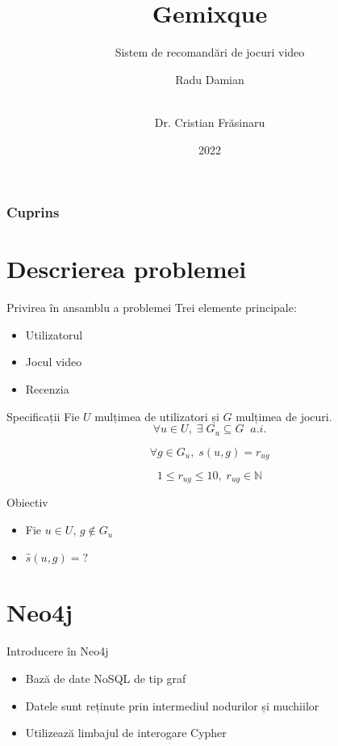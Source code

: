 \documentclass{beamer}
\title[Gemixque - sistem de recomandări de jocuri video]{Gemixque}
\subtitle{Sistem de recomandări de jocuri video}
\author[Radu Damian]{Radu Damian \and \\[9mm] Dr. Cristian Frăsinaru}
\institute{Facultatea de Informatică}
\date{2022}
\begin{document}
\frame{\titlepage}


\begin{frame}
  \frametitle{Cuprins}
  \tableofcontents
\end{frame}

\section{Descrierea problemei}
\frame{\tableofcontents[currentsection]}

\begin{frame}{Privirea în ansamblu a problemei}
   Trei elemente principale:
   \begin{itemize}
  \item Utilizatorul
  \item Jocul video
  \item Recenzia
  \end{itemize}
\end{frame}

\begin{frame}{Specificații}
    Fie  \(U \)  mulțimea de utilizatori și \( G \) mulțimea de  jocuri. 
     \[ \forall  u  \in  U,  \;  \exists \; G_u \subseteq  G \;\; a.i. \] 
     
     \[ \forall g \in G_u, \; s(u, g) = r_{ug}\]
     
     \[ 1 \leq r_{ug} \leq 10, \;  r_{ug} \in \mathbb{N} \]
    
\end{frame}

\begin{frame}{Obiectiv}
\begin{itemize}
  \item Fie \( u \in U \), \(g \notin G_u \) 
  \item \( \hat{s}(u, g) = ?\)
  \end{itemize}
\end{frame}

\section{Neo4j}
\frame{\tableofcontents[currentsection]}
\begin{frame}{Introducere în Neo4j}
    \begin{itemize}
        \item Bază de date NoSQL de tip graf
        \item Datele sunt reținute prin intermediul nodurilor și muchiilor
        \item Utilizează limbajul de interogare Cypher
    \end{itemize}
\end{frame}
\end{document}
